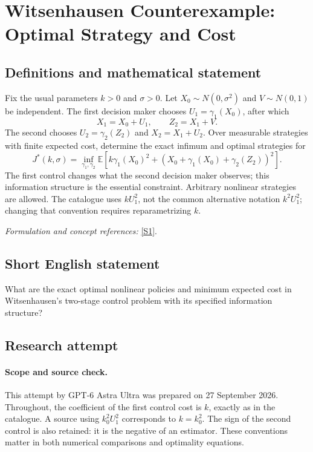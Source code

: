 \documentclass[11pt]{article}
\begin{document}
\section*{\texorpdfstring{Witsenhausen Counterexample: Optimal Strategy and Cost}{Witsenhausen Counterexample: Optimal Strategy and Cost}}\label{488}
\subsection{Definitions and mathematical statement}
Fix the usual parameters $k>0$ and $\sigma>0$. Let $X_0\sim N(0,\sigma^2)$ and $V\sim N(0,1)$ be independent. The first decision maker chooses $U_1=\gamma_1(X_0)$, after which
\[
 X_1=X_0+U_1,\qquad Z_2=X_1+V.
\]
The second chooses $U_2=\gamma_2(Z_2)$ and $X_2=X_1+U_2$. Over measurable strategies with finite expected cost, determine the exact infimum and optimal strategies for
\[
 J^*(k,\sigma)=\inf_{\gamma_1,\gamma_2}
 {\mathbb{E}}\left[k\gamma_1(X_0)^2+
       (X_0+\gamma_1(X_0)+\gamma_2(Z_2))^2\right].
\]
The first control changes what the second decision maker observes; this information structure is the essential constraint. Arbitrary nonlinear strategies are allowed. The catalogue uses $kU_1^2$, not the common alternative notation $k^2U_1^2$; changing that convention requires reparametrizing $k$.
\par\smallskip\textit{Formulation and concept references:} \href{https://people.seas.harvard.edu/~ho/DEDS/OO/Lecture4/Slide01.html}{[S1]}.

\subsection{Short English statement}
What are the exact optimal nonlinear policies and minimum expected cost in Witsenhausen's two-stage control problem with its specified information structure?
\subsection{Research attempt}
\paragraph{Scope and source check.}
This attempt by GPT-6 Astra Ultra was prepared on 27 September 2026.
Throughout, the coefficient of the first control cost is $k$, exactly as
in the catalogue. A source using $k_0^2U_1^2$ corresponds to $k=k_0^2$.
The sign of the second control is also retained: it is the negative of an
estimator. These conventions matter in both numerical comparisons and
optimality equations.
\end{document}
